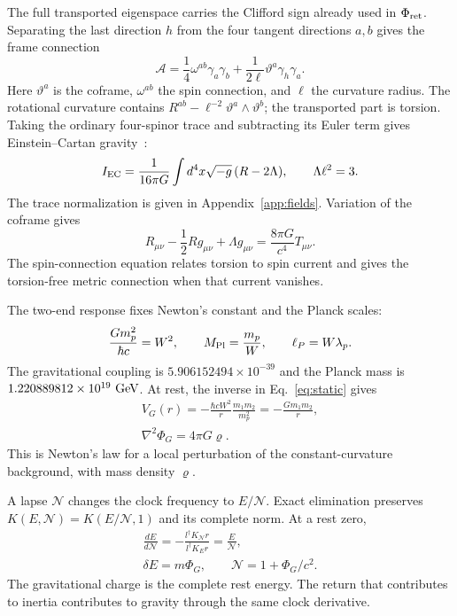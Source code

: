 \documentclass[aps,prx,reprint,longbibliography]{revtex4-2}
\providecommand{\Phis}{\Phi_{\rm ret}}
\begin{document}
The full transported eigenspace carries the Clifford sign already used in $\Phis$. Separating the last direction $h$ from the four tangent directions $a,b$ gives the frame connection
\begin{equation}
 \mathcal A=\frac14\omega^{ab}\gamma_a\gamma_b
       +\frac1{2\ell}\vartheta^a\gamma_h\gamma_a.
 \label{eq:cartan}
\end{equation}
Here $\vartheta^a$ is the coframe, $\omega^{ab}$ the spin connection, and $\ell$ the curvature radius. The rotational curvature contains $R^{ab}-\ell^{-2}\vartheta^a\wedge\vartheta^b$; the transported part is torsion. Taking the ordinary four-spinor trace and subtracting its Euler term gives Einstein--Cartan gravity~\cite{Cartan,MacDowellMansouri}:
\begin{equation}
 I_{\rm EC}=\frac1{16\pi G}\int d^4x\sqrt{-g}\,(R-2\Lambda),
 \qquad\Lambda\ell^2=3.
 \label{eq:EH}
\end{equation}
The trace normalization is given in Appendix~\ref{app:fields}. Variation of the coframe gives
\begin{equation}
 R_{\mu\nu}-\frac12Rg_{\mu\nu}+\Lambda g_{\mu\nu}
 =\frac{8\pi G}{c^4}T_{\mu\nu}.
 \label{eq:einstein}
\end{equation}
The spin-connection equation relates torsion to spin current and gives the torsion-free metric connection when that current vanishes.

The two-end response fixes Newton's constant and the Planck scales:
\begin{equation}
 \frac{Gm_p^2}{\hbar c}=W^2,\qquad
 M_{\rm Pl}=\frac{m_p}{W},\qquad\ell_P=W\lambda_p.
 \label{eq:planck}
\end{equation}
The gravitational coupling is $5.906152494\times10^{-39}$ and the Planck mass is $1.220889812\times10^{19}\ {\rm GeV}$. At rest, the inverse in Eq.~\eqref{eq:static} gives
\begin{equation}
\begin{gathered}
 V_G(r)=-\frac{\hbar cW^2}{r}\frac{m_1m_2}{m_p^2}
       =-\frac{Gm_1m_2}{r},\\
 \nabla^2\Phi_G=4\pi G\varrho.
 \end{gathered}
 \label{eq:newton}
\end{equation}
This is Newton's law for a local perturbation of the constant-curvature background, with mass density $\varrho$.

A lapse $\mathcal N$ changes the clock frequency to $E/\mathcal N$. Exact elimination preserves $K(E,\mathcal N)=K(E/\mathcal N,1)$ and its complete norm. At a rest zero,
\begin{equation}
\begin{gathered}
 \frac{dE}{d\mathcal N}
 =-\frac{l^\dagger K_{\mathcal N}r}{l^\dagger K_Er}
 =\frac E{\mathcal N},\\
 \delta E=m\Phi_G,\qquad\mathcal N=1+\Phi_G/c^2.
 \end{gathered}
 \label{eq:lapse}
\end{equation}
The gravitational charge is the complete rest energy. The return that contributes to inertia contributes to gravity through the same clock derivative.
\end{document}
